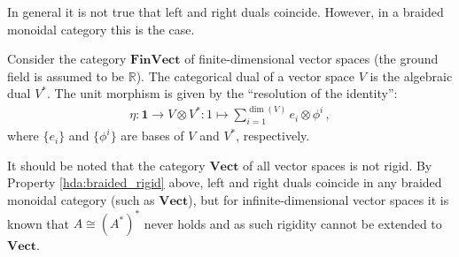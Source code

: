 
    \begin{property}\label{hda:braided_rigid}
        In general it is not true that left and right duals coincide. However, in a braided monoidal category this is the case.
    \end{property}

    \begin{example}[FinVect]
        Consider the category $\mathbf{FinVect}$ of finite-dimensional vector spaces (the ground field is assumed to be $\mathbb{R}$). The categorical dual of a vector space $V$ is the algebraic dual $V^*$. The unit morphism is given by the ``resolution of the identity'':
        \begin{gather}
            \eta:\mathbf{1}\rightarrow V\otimes V^*:1\mapsto\sum_{i=1}^{\dim(V)}e_i\otimes\phi^i\,,
        \end{gather}
        where $\{e_i\}$ and $\{\phi^i\}$ are bases of $V$ and $V^*$, respectively.

        It should be noted that the category $\mathbf{Vect}$ of all vector spaces is not rigid. By Property \ref{hda:braided_rigid} above, left and right duals coincide in any braided monoidal category (such as $\mathbf{Vect}$), but for infinite-dimensional vector spaces it is known that $A\cong(A^*)^*$ never holds and as such rigidity cannot be extended to $\mathbf{Vect}$.
    \end{example}

